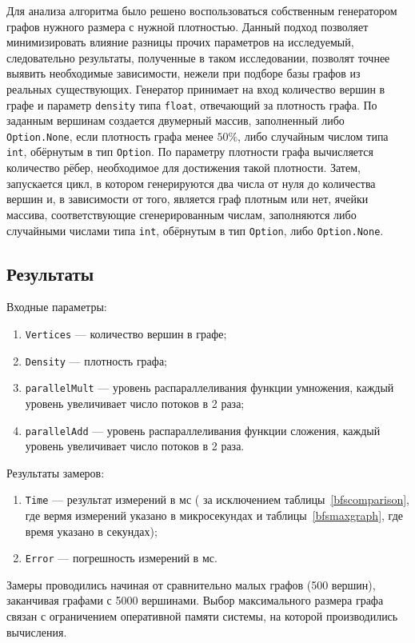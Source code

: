 Для анализа алгоритма было решено воспользоваться собственным генератором графов нужного размера с нужной плотностью. Данный подход позволяет минимизировать влияние разницы прочих параметров на исследуемый, следовательно результаты, полученные в таком исследовании, позволят точнее выявить необходимые зависимости, нежели при подборе базы графов из реальных существующих. Генератор принимает на вход количество вершин в графе и параметр \texttt{density} типа \texttt{float}, отвечающий за плотность графа. По заданным вершинам создается двумерный массив, заполненный либо \texttt{Option.None}, если плотность графа менее $50\%$, либо случайным числом типа \texttt{int}, обёрнутым в тип \texttt{Option}. По параметру плотности графа вычисляется количество рёбер, необходимое для достижения такой плотности.
Затем, запускается цикл, в котором генерируются два числа от нуля до количества вершин и, в зависимости от того, является граф плотным или нет, ячейки массива, соответствующие сгенерированным числам, заполняются либо случайными числами типа \texttt{int}, обёрнутым в тип \texttt{Option}, либо \texttt{Option.None}.  


\subsection{Результаты}

Входные параметры:
 \begin{enumerate}
 \item  \texttt{Vertices} --- количество вершин в графе; 
 \item  \texttt{Density} --- плотность графа;
 \item \texttt{parallelMult} --- уровень распараллеливания функции умножения, каждый уровень увеличивает число потоков в 2 раза;
  \item \texttt{parallelAdd} --- уровень распараллеливания функции сложения, каждый уровень увеличивает число потоков в 2 раза.
\end{enumerate}

Результаты замеров:
\begin{enumerate}
\item  \texttt{Time} --- результат измерений в мс ( за исключением таблицы~\ref{bfscomparison}, где вермя измерений указано в микросекундах и таблицы~\ref{bfsmaxgraph}, где время указано в секундах);
\item  \texttt{Error} --- погрешность измерений в мс.
\end{enumerate}

Замеры проводились начиная от сравнительно малых графов (500 вершин), заканчивая графами с 5000 вершинами. Выбор максимального размера графа связан с ограничением оперативной памяти системы, на которой производились вычисления.

